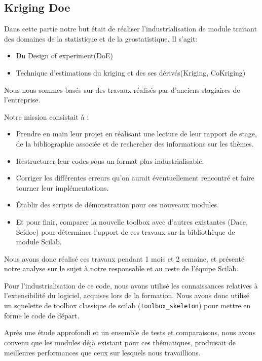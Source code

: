 \subsection*{Kriging Doe}

Dans cette partie notre but était de réaliser l’industrialisation
de module traitant des domaines de la statistique et de la
geostatistique. Il s'agit:
\begin{itemize}
\item Du Design of experiment(DoE)
\item Technique d’estimations du kriging et des ses dérivés(Kriging, CoKriging)
\end{itemize}
Nous nous sommes bas\'es sur des travaux réalisés par d’anciens
stagiaires de l’entreprise.

Notre mission consistait à :

\begin{itemize}
    \item Prendre en main leur projet en réalisant une lecture
        de leur rapport de stage, de la bibliographie associée
        et de rechercher des informations sur les thèmes.
    \item Restructurer leur codes sous un format plus industrialisable.
    \item Corriger les différentes erreurs qu’on aurait
        éventuellement rencontré et faire tourner leur implémentations.
    \item Établir des scripts de démonstration pour ces nouveaux modules.
    \item Et pour finir, comparer la nouvelle toolbox avec d’autres
        existantes (Dace, Scidoe) pour déterminer l’apport de ces
        travaux sur la bibliothèque de module Scilab.
\end{itemize}

Nous avons donc réalisé ces travaux pendant 1 mois et 2 semaine,
et présent\'e notre analyse sur le sujet à notre responsable
et au reste de l’équipe Scilab.

Pour l'industrialisation de ce code,
nous avons utilisé les connaissances relatives à
l’extensibilité du logiciel, acquises lors de la formation.
Nous avons donc utilisé un squelette de toolbox classique
de scilab ({\tt toolbox\_skeleton}) pour mettre en forme
le code de départ.

Après une étude approfondi et un ensemble de tests et comparaisons,
nous avons convenu que les modules déjà existant pour ces thématiques,
produisait de meilleures performances que ceux sur lesquels nous travaillions.

